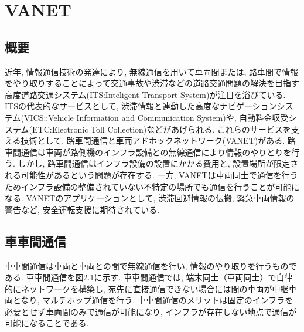 \documentclass[10pt]{jreport}
\begin{document}

\chapter{VANET}
\vspace{-5mm}
\section{概要}
近年, 情報通信技術の発達により, 無線通信を用いて車両間または, 路車間で情報をやり取りすることによって交通事故や渋滞などの道路交通問題の解決を目指す高度道路交通システム(ITS:Inteligent Transport System)が注目を浴びている\cite{sample7}. ITSの代表的なサービスとして, 渋滞情報と連動した高度なナビゲーションシステム(VICS::Vehicle Information and Communication System)\cite{sample8}や, 自動料金収受システム(ETC:Electronic Toll Collection)\cite{sample9}などがあげられる. これらのサービスを支える技術として, 路車間通信と車両アドホックネットワーク(VANET)がある. 路車間通信は車両が路側機のインフラ設備との無線通信により情報のやりとりを行う. しかし, 路車間通信はインフラ設備の設置にかかる費用と, 設置場所が限定される可能性があるという問題が存在する. 一方, VANETは車両同士で通信を行うためインフラ設備の整備されていない不特定の場所でも通信を行うことが可能になる. VANETのアプリケーションとして, 渋滞回避情報の伝搬, 緊急車両情報の警告など, 安全運転支援に期待されている. 
\section{車車間通信}
車車間通信は車両と車両との間で無線通信を行い, 情報のやり取りを行うものである. 車車間通信を図2.1に示す. 車車間通信では, 端末同士（車両同士）で自律的にネットワークを構築し, 宛先に直接通信できない場合には間の車両が中継車両となり, マルチホップ通信を行う. 車車間通信のメリットは固定のインフラを必要とせず車両間のみで通信が可能になり, インフラが存在しない地点で通信が可能になることである. 
\end{document}
